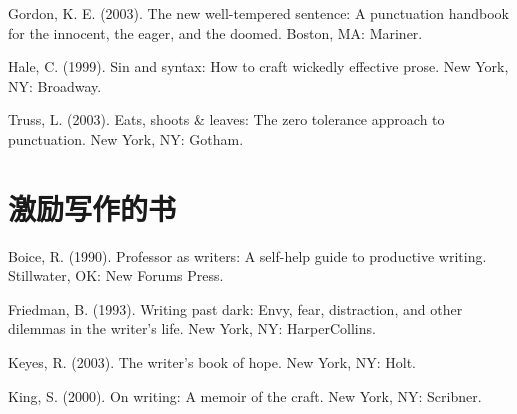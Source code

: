 Gordon, K. E. (2003). The new well-tempered sentence: A punctuation handbook for the innocent, the eager, and the doomed. Boston, MA: Mariner.

Hale, C. (1999). Sin and syntax: How to craft wickedly effective prose. New York, NY: Broadway.

Truss, L. (2003). Eats, shoots \& leaves: The zero tolerance approach to punctuation. New York, NY: Gotham.




\section{激励写作的书}
Boice, R. (1990). Professor as writers: A self-help guide to productive writing. Stillwater, OK: New Forums Press.

Friedman, B. (1993). Writing past dark: Envy, fear, distraction, and other dilemmas in the writer's life. New York, NY: HarperCollins.

Keyes, R. (2003). The writer's book of hope. New York, NY: Holt.

King, S. (2000). On writing: A memoir of the craft. New York, NY: Scribner.


